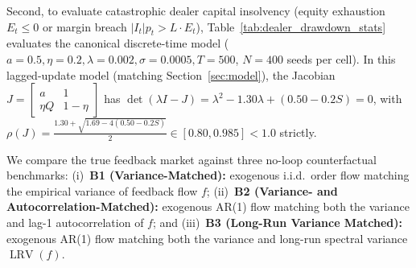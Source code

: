 \documentclass[12pt]{article}
\theoremstyle{definition}
\theoremstyle{remark}
\begin{document}
Second, to evaluate catastrophic dealer capital insolvency (equity exhaustion $E_t \le 0$ or margin breach $|I_t| p_t > L \cdot E_t$), Table~\ref{tab:dealer_drawdown_stats} evaluates the canonical discrete-time model ($a=0.5, \eta=0.2, \lambda=0.002, \sigma=0.0005, T=500$, $N=400$ seeds per cell). In this lagged-update model (matching Section~\ref{sec:model}), the Jacobian $J = \begin{bmatrix} a & 1 \\ \eta Q & 1 - \eta \end{bmatrix}$ has $\det(\lambda I - J) = \lambda^2 - 1.30 \lambda + (0.50 - 0.2 S) = 0$, with $\rho(J) = \frac{1.30 + \sqrt{1.69 - 4(0.50 - 0.2 S)}}{2} \in [0.80, 0.985] < 1.0$ strictly.

We compare the true feedback market against three no-loop counterfactual benchmarks: (i)~\textbf{B1 (Variance-Matched):} exogenous i.i.d.\ order flow matching the empirical variance of feedback flow $f$; (ii)~\textbf{B2 (Variance- and Autocorrelation-Matched):} exogenous AR(1) flow matching both the variance and lag-1 autocorrelation of $f$; and (iii)~\textbf{B3 (Long-Run Variance Matched):} exogenous AR(1) flow matching both the variance and long-run spectral variance $\operatorname{LRV}(f)$.

\begin{table}[htbp]
\centering\footnotesize
\setlength{\tabcolsep}{4pt}
\caption{\textbf{Dealer Solvency Phase Diagram Across Feedback Persistence $S$ Inside the Spectrally Stable Regime ($\rho(J) < 1.0$).}
Dealer halt rates (exact $95\%$ binomial intervals in brackets) under the canonical closed-loop feedback market ($a=0.5, \eta=0.2, \lambda=0.002, \sigma=0.0005, T=500$) and three no-loop counterfactual benchmarks: B1 (variance-matched), B2 (variance and lag-1 autocorrelation matched), and B3 (variance and long-run variance matched). Panel A presents baseline leverage ($L=10$), while Panel B evaluates expanded leverage ($L=20$). Across all rows, eigenvalues lie strictly inside the unit disk ($\rho(J) \in [0.80, 0.985] < 1.0$). Solvency failure rises steeply from $11.0\%$ to $100.0\%$, driven by the $(1-S)^{-2}$ low-frequency variance explosion most closely matched by benchmark B3.}
\label{tab:dealer_drawdown_stats}
\resizebox{\textwidth}{!}{%

}
\end{table}
\end{document}
